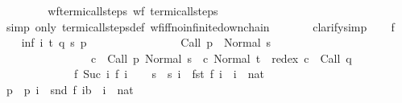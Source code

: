 \begin{isabellebody}
\isanewline
\ \ \ \ \isamarkupfalse%
\isanewline
\ \ \isamarkupfalse%
\isanewline
{}\isamarkupfalse%
%
\endisatagproof
{\isafoldproof}%
%
\isadelimproof
\isanewline
%
\endisadelimproof
\isanewline
{}\isamarkupfalse%
\ wf{\isacharunderscore}termi{\isacharunderscore}call{\isacharunderscore}steps{\isacharcolon}\ {\isachardoublequoteopen}wf\ {\isacharparenleft}termi{\isacharunderscore}call{\isacharunderscore}steps\ {\isasymGamma}{\isacharparenright}{\isachardoublequoteclose}\isanewline
%
\isadelimproof
%
\endisadelimproof
%
\isatagproof
{}\isamarkupfalse%
\ {\isacharparenleft}simp\ only{\isacharcolon}\ termi{\isacharunderscore}call{\isacharunderscore}steps{\isacharunderscore}def\ wf{\isacharunderscore}iff{\isacharunderscore}no{\isacharunderscore}infinite{\isacharunderscore}down{\isacharunderscore}chain{\isacharcomma}\isanewline
\ \ \ \ \ \ \ clarify{\isacharcomma}simp{\isacharparenright}\isanewline
\ \ \isamarkupfalse%
\ f\isanewline
\ \ \isamarkupfalse%
\ inf{\isacharcolon}\ {\isachardoublequoteopen}{\isasymforall}i{\isachardot}\ {\isacharparenleft}{\isasymlambda}{\isacharparenleft}t{\isacharcomma}\ q{\isacharparenright}\ {\isacharparenleft}s{\isacharcomma}\ p{\isacharparenright}{\isachardot}\isanewline
\ \ \ \ \ \ \ \ \ \ \ \ \ \ \ \ {\isasymGamma}{\isasymturnstile}Call\ p\ {\isasymdown}\ Normal\ s\ {\isasymand}\isanewline
\ \ \ \ \ \ \ \ \ \ \ \ \ \ \ \ {\isacharparenleft}{\isasymexists}c{\isachardot}\ {\isasymGamma}{\isasymturnstile}\ {\isacharparenleft}Call\ p{\isacharcomma}\ Normal\ s{\isacharparenright}\ {\isasymrightarrow}\isactrlsup {\isacharplus}\ {\isacharparenleft}c{\isacharcomma}\ Normal\ t{\isacharparenright}\ {\isasymand}\ redex\ c\ {\isacharequal}\ Call\ q{\isacharparenright}{\isacharparenright}\isanewline
\ \ \ \ \ \ \ \ \ \ \ \ \ {\isacharparenleft}f\ {\isacharparenleft}Suc\ i{\isacharparenright}{\isacharparenright}\ {\isacharparenleft}f\ i{\isacharparenright}{\isachardoublequoteclose}\isanewline
\ \ \isamarkupfalse%
\ s\ \ {\isachardoublequoteopen}s\ i\ {\isacharequal}\ fst\ {\isacharparenleft}f\ i{\isacharparenright}{\isachardoublequoteclose}\ \ i\ {\isacharcolon}{\isacharcolon}\ nat\isanewline
\ \ \isamarkupfalse%
\ p\ \ {\isachardoublequoteopen}p\ i\ {\isacharequal}\ {\isacharparenleft}snd\ {\isacharparenleft}f\ i{\isacharparenright}{\isacharcolon}{\isacharcolon}{\isacharprime}b{\isacharparenright}{\isachardoublequoteclose}\ \ i\ {\isacharcolon}{\isacharcolon}\ nat\isanewline

\end{isabellebody}
